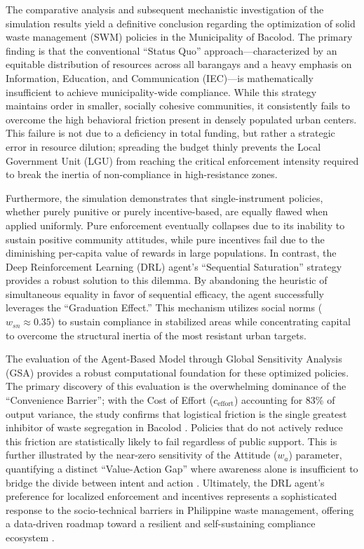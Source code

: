 The comparative analysis and subsequent mechanistic investigation of the simulation results yield a definitive conclusion regarding the optimization of solid waste management (SWM) policies in the Municipality of Bacolod. The primary finding is that the conventional ``Status Quo'' approach---characterized by an equitable distribution of resources across all barangays and a heavy emphasis on Information, Education, and Communication (IEC)---is mathematically insufficient to achieve municipality-wide compliance. While this strategy maintains order in smaller, socially cohesive communities, it consistently fails to overcome the high behavioral friction present in densely populated urban centers. This failure is not due to a deficiency in total funding, but rather a strategic error in resource dilution; spreading the budget thinly prevents the Local Government Unit (LGU) from reaching the critical enforcement intensity required to break the inertia of non-compliance in high-resistance zones.

Furthermore, the simulation demonstrates that single-instrument policies, whether purely punitive or purely incentive-based, are equally flawed when applied uniformly. Pure enforcement eventually collapses due to its inability to sustain positive community attitudes, while pure incentives fail due to the diminishing per-capita value of rewards in large populations. In contrast, the Deep Reinforcement Learning (DRL) agent’s ``Sequential Saturation'' strategy provides a robust solution to this dilemma. By abandoning the heuristic of simultaneous equality in favor of sequential efficacy, the agent successfully leverages the ``Graduation Effect.'' This mechanism utilizes social norms ($w_{sn} \approx 0.35$) to sustain compliance in stabilized areas while concentrating capital to overcome the structural inertia of the most resistant urban targets.

The evaluation of the Agent-Based Model through Global Sensitivity Analysis (GSA) provides a robust computational foundation for these optimized policies. The primary discovery of this evaluation is the overwhelming dominance of the ``Convenience Barrier''; with the Cost of Effort ($c_{\text{effort}}$) accounting for 83\% of output variance, the study confirms that logistical friction is the single greatest inhibitor of waste segregation in Bacolod \citep{Yazawa2025}. Policies that do not actively reduce this friction are statistically likely to fail regardless of public support. This is further illustrated by the near-zero sensitivity of the Attitude ($w_a$) parameter, quantifying a distinct ``Value-Action Gap'' where awareness alone is insufficient to bridge the divide between intent and action \citep{Zhao2022}. Ultimately, the DRL agent’s preference for localized enforcement and incentives represents a sophisticated response to the socio-technical barriers in Philippine waste management, offering a data-driven roadmap toward a resilient and self-sustaining compliance ecosystem \citep{Jimenez2025}.